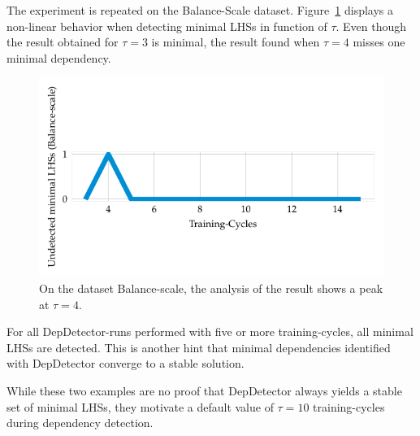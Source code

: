 The experiment is repeated on the Balance-Scale dataset.
Figure~\ref{fig:dep_detector_lhs_stability_balance_scale} displays a non-linear behavior when detecting minimal LHSs in function of \( \tau \).
Even though the result obtained for \( \tau = 3 \) is minimal, the result found when \( \tau = 4 \) misses one minimal dependency.
\begin{figure}[ht]
     \centering
     \includegraphics[width=\textwidth]{../figures/balance-scale/dep_detector_lhs_stability.pdf}
     \caption{On the dataset Balance-scale, the analysis of the result shows a peak at \( \tau = 4 \).}
     \label{fig:dep_detector_lhs_stability_balance_scale}
\end{figure}
For all DepDetector-runs performed with five or more training-cycles, all minimal LHSs are detected.
This is another hint that minimal dependencies identified with DepDetector converge to a stable solution.

While these two examples are no proof that DepDetector always yields a stable set of minimal LHSs, they motivate a default value of \( \tau = 10 \) training-cycles during dependency detection.
